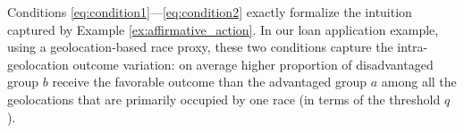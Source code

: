 

Conditions \eqref{eq:condition1}---\eqref{eq:condition2} exactly formalize the intuition captured by Example \ref{ex:affirmative_action}.
In our loan application example, using a geolocation-based race proxy, these two conditions capture the intra-geolocati\-on outcome variation:
on average higher proportion of disadvantaged group $b$ receive the favorable outcome than the advantaged group $a$ among all the geolocations that are primarily occupied by one race (in terms of the threshold $q$).

